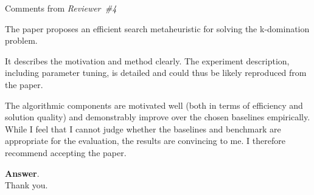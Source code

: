 \documentclass [11pt]{scrartcl}
\begin{document}
\begin{center} Comments from \textit{Reviewer\ \#4}

\end{center}

\begin{leftbar}
	The paper proposes an efficient search metaheuristic for solving the k-domination problem.
	
	It describes the motivation and method clearly. The experiment description, including parameter tuning, is detailed and could thus be likely reproduced from the paper.
	
	The algorithmic components are motivated well (both in terms of efficiency and solution quality) and demonstrably improve over the chosen baselines empirically. While I feel that I cannot judge whether the baselines and benchmark are appropriate for the evaluation, the results are convincing to me. I therefore recommend accepting the paper.
\end{leftbar}

\textbf{Answer}.\\ 
Thank you. 





\end{document}
